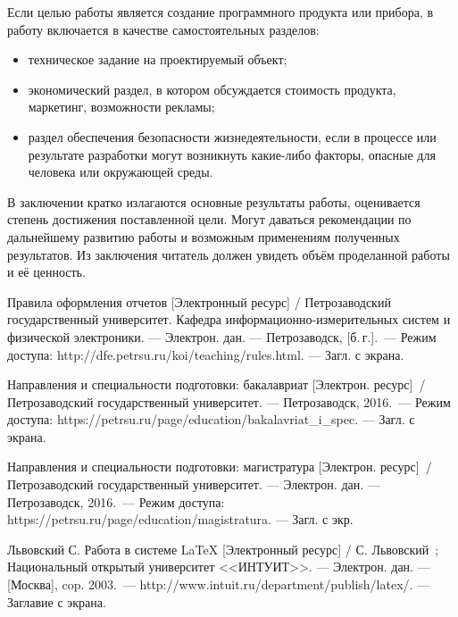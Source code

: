 \documentclass[utf8,12pt, coursreport]{G7-32}
\begin{document}
Если целью работы является создание программного продукта или прибора, в работу включается в качестве самостоятельных разделов:
\begin{itemize}
\item техническое задание на проектируемый объект;
\item экономический раздел, в котором обсуждается стоимость продукта, маркетинг, возможности рекламы;
\item раздел обеспечения безопасности жизнедеятельности, если в процессе или результате разработки могут возникнуть какие-либо факторы, опасные для человека или окружающей среды.
\end{itemize}


\backmatter %

\Conclusion

В заключении кратко излагаются основные результаты работы, оценивается степень достижения поставленной цели. Могут даваться рекомендации по дальнейшему развитию работы и возможным применениям полученных результатов. Из заключения читатель должен увидеть объём проделанной работы и её ценность.

\begin{thebibliography}{99}
 Правила оформления отчетов [Электронный ресурс] / Петрозаводский государственный университет. Кафедра информационно-измерительных систем и физической электроники. --- Электрон. дан. --- Петрозаводск, [б.\,г.].~--- Режим доступа: http://dfe.petrsu.ru/koi/teaching/rules.html. --- Загл. с экрана.

 Направления и специальности подготовки: бакалавриат [Электрон. ресурс]~/ Петрозаводский государственный университет. --- Петрозаводск, 2016.~--- Режим доступа: https://petrsu.ru/page/education/bakalavriat\_i\_spec. --- Загл. с экрана.

 Направления и специальности подготовки: магистратура [Электрон. ресурс]~/ Петрозаводский государственный университет. --- Электрон. дан. --- Петрозаводск, 2016.~--- Режим доступа: https://petrsu.ru/page/education/magistratura. --- Загл. с экр.

 Львовский С. Работа в системе LaTeX [Электронный ресурс] / С. Львовский~; Национальный открытый университет <<ИНТУИТ>>. --- Электрон. дан. --- [Москва], cop. 2003.~--- http://www.intuit.ru/department/publish/latex/. --- Заглавие с экрана.

\end{thebibliography}
\end{document}
